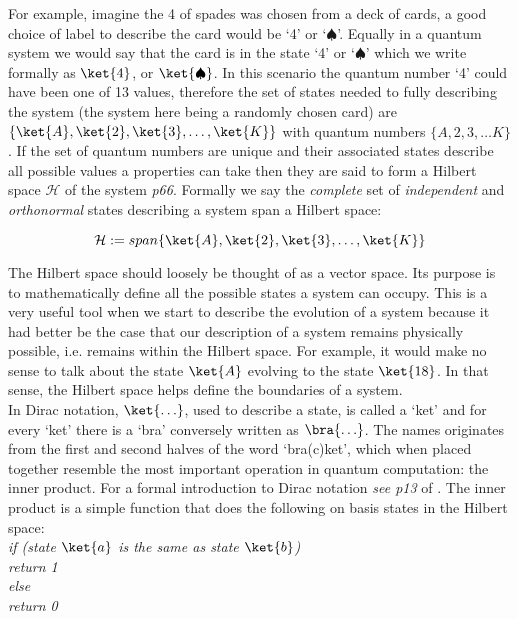 For example, imagine the 4 of spades was chosen from a deck of cards, a good choice of label to describe the card would be `4' or `$\spadesuit$'. Equally in a quantum system we would say that the card is in the state `4' or `$\spadesuit$' which we write formally as $\ket{4}$, or $\ket{\spadesuit}$. In this scenario the quantum number `4' could have been one of 13 values, therefore the set of states needed to fully describing the system (the system here being a randomly chosen card) are $\{\ket{A}, \ket{2}, \ket{3},\ldots ,\ket{K}\}$ with quantum numbers $\{A,2,3,\ldots K\}$. If the set of quantum numbers are unique and their associated states describe all possible values a properties can take then they are said to form a Hilbert space $\mathcal{H}$ of the system \cite{nielsen_chuang_2010} \textit{p66}. Formally we say the \textit{complete} set of \textit{independent} and \textit{orthonormal} states describing a system span a Hilbert space:

\begin{equation}
\mathcal{H}:=span\{\ket{A}, \ket{2}, \ket{3},\ldots ,\ket{K}\}
\end{equation}

The Hilbert space should loosely be thought of as a vector space. Its purpose is to mathematically define all the possible states a system can occupy. This is a very useful tool when we start to describe the evolution of a system because it had better be the case that our description of a system remains physically possible, i.e. remains within the Hilbert space. For example, it would make no sense to talk about the state $\ket{A}$ evolving to the state $\ket{18}$. In that sense, the Hilbert space helps define the boundaries of a system.\\

In Dirac notation, $\ket{\ldots}$, used to describe a state, is called a `ket' and for every `ket' there is a `bra' conversely written as $\bra{\ldots}$. The names originates from the first and second halves of the word `bra(c)ket', which when placed together resemble the most important operation in quantum computation: the inner product. For a formal introduction to Dirac notation \textit{see p13} of \cite{nielsen_chuang_2010}. The inner product is a simple function that does the following on basis states in the Hilbert space:\\

\textit{if (state $\ket{a}$ is the same as state $\ket{b}$)\\ 
    return 1 \\
else \\
    return 0}\\ 

